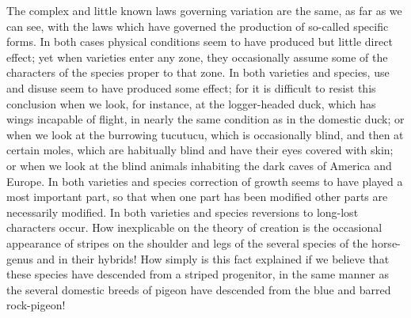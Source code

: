 \indent The complex and little known laws governing variation are the same, as far as we can see, with the laws which have governed the production of so-called specific forms. In both cases physical conditions seem to have produced but little direct effect; yet when varieties enter any zone, they occasionally assume some of the characters of the species proper to that zone. In both varieties and species, use and disuse seem to have produced some effect; for it is difficult to resist this conclusion when we look, for instance, at the logger-headed duck, which has wings incapable of flight, in nearly the same condition as in the domestic duck; or when we look at the burrowing tucutucu, which is occasionally blind, and then at certain moles, which are habitually blind and have their eyes covered with skin; or when we look at the blind animals inhabiting the dark caves of America and Europe. In both varieties and species correction of growth seems to have played a most important part, so that when one part has been modified other parts are necessarily modified. In both varieties and species reversions to long-lost characters occur. How inexplicable on the theory of creation is the occasional appearance of stripes on the shoulder and legs of the several species of the horse-genus and in their hybrids! How simply is this fact explained if we believe that these species have descended from a striped progenitor, in the same manner as the several domestic breeds of pigeon have descended from the blue and barred rock-pigeon!~\\
